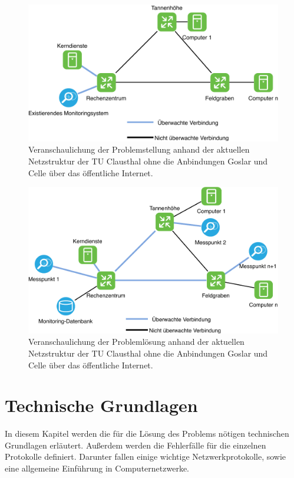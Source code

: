 \documentclass[titlepage]{report}
\begin{document}
\begin{figure}[H]
    \centering
    \includegraphics[width=1.0\textwidth]{figures/problemstellung.pdf}
    \caption{Veranschaulichung der Problemstellung anhand der aktuellen
    Netzstruktur der TU Clausthal ohne die Anbindungen Goslar und Celle
    über das öffentliche Internet.}\label{fig:problemstellung}
\end{figure}
\begin{figure}[H]
    \centering
    \includegraphics[width=1.0\textwidth]{figures/problemloesung.pdf}
    \caption{Veranschaulichung der Problemlösung anhand der aktuellen
    Netzstruktur der TU Clausthal ohne die Anbindungen Goslar und Celle
    über das öffentliche Internet.}\label{fig:problemloesung}
\end{figure}
\chapter*{Technische Grundlagen}
In diesem Kapitel werden die für die Lösung des Problems nötigen
technischen Grundlagen erläutert. Außerdem werden die Fehlerfälle für
die einzelnen Protokolle definiert. Darunter fallen einige wichtige
Netzwerkprotokolle, sowie eine allgemeine Einführung in
Computernetzwerke.
\end{document}
